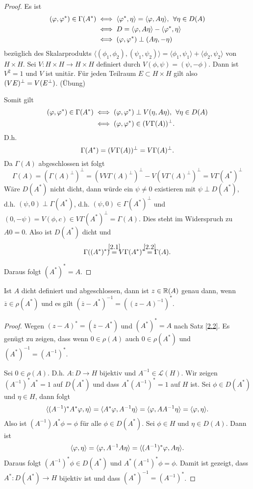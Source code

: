 \documentclass{mycourse}
\begin{document}
\begin{proof}
Es ist
\begin{align*}
(\phi, \phi^*)\in \Gamma(A^*) &\iff \langle \phi^*, \eta\rangle = \langle \phi, A\eta\rangle, \, \forall \eta\in D(A)\\ &\iff D=\langle \phi, A\eta\rangle - \langle \phi^*, \eta\rangle \\ &\iff (\phi, \phi^*) \orth (A\eta, - \eta)
\end{align*}
bezüglich des Skalarprodukts $\langle (\phi_1, \phi_2), (\psi_1, \psi_2)\rangle=\langle \phi_1, \psi_1\rangle + \langle \phi_2, \psi_2\rangle$ von $H\times H$. Sei $V:H\times H \to H \times H$ definiert durch $V(\phi, \psi)=(\psi, -\phi)$. Dann ist $V^2=1$ und $V$ ist unitär. Für jeden Teilraum $E\subset H\times H$ gilt also $(VE)^\perp = V(E^\perp)$. (Übung)

Somit gilt
\begin{align*}
(\phi, \phi^*) \in \Gamma(A^*) &\iff (\phi, \phi^*) \orth V(\eta, A\eta), \, \forall \eta\in D(A)\\
&\iff (\phi, \phi^*)\in (V\Gamma(A))^\orth.
\end{align*}
D.h. 
\begin{equation}\label{2.1}
\Gamma(A^*)=(V\Gamma(A))^\perp=V\Gamma(A)^\perp.
\end{equation}
Da $\Gamma(A)$ abgeschlossen ist folgt 
\begin{equation}\label{2.2}
\Gamma(A) = ( \Gamma(A)^\perp)^\perp = (VV \Gamma(A)^\perp)^\perp - V(V\Gamma(A)^\perp)^\perp = V \Gamma(A^*)^\perp
\end{equation}
Wäre $D(A^*)$ nicht dicht, dann würde ein $\psi \neq 0$ existieren mit $\psi \perp D(A^*)$, d.h. $(\psi,0) \perp \Gamma(A^*)$, d.h. $(\psi,0) \in \Gamma(A^*)^\perp$ und $(0,-\psi)=V(\phi, c) \in V \Gamma(A^*)^\perp= \Gamma(A)$. Dies steht im Widerspruch zu $A0=0$. Also ist $D(A^*)$ dicht und
\[
\Gamma((A^*)^*)\stack{\eqref{2.1}}= V \Gamma(A^*)^* \stack{\eqref{2.2}}= \Gamma(A).
\]
Daraus folgt $(A^*)^*=A$.
\end{proof}
\begin{st}\label{2.3}
Ist $A$ dicht definiert und abgeschlossen, dann ist $z\in \mathbb{R}(A)$ genau dann, wenn $\overline z \in \rho(A^*)$ und es gilt $(\overline z - A^*)^{-1} =((z-A)^{-1})^*$.
\end{st}
\begin{proof}
Wegen $(z-A)^* =(\overline z-A^*)$ und $(A^*)^*=A$ nach Satz \ref{2.2}. Es genügt zu zeigen, dass wenn $0 \in \rho(A)$ auch $0 \in \rho(A^*)$ und $(A^*)^{-1} = (A^{-1})^*$.

Sei $0 \in \rho(A)$. D.h. $A: D\to H$ bijektiv und $A^{-1} \in \mathcal L(H)$. Wir zeigen $(A^{-1})^* A^*=1$ auf $D(A^*)$ und dass $A^*(A^{-1})^*=1$ auf $H$ ist. Sei $\phi \in D(A^*)$ und $\eta \in H$, dann folgt
\[
\langle(A^{-1})^* A^* \varphi, \eta \rangle = \langle A^* \varphi, A^{-1} \eta \rangle = \langle \varphi, A A^{-1} \eta\rangle = \langle \varphi, \eta\rangle.
\]
Also ist $(A^{-1}) A^* \phi = \phi$ für alle $\phi \in D(A^*)$. Sei $\phi \in H$ und $\eta\in D(A)$. Dann ist
\[
\langle \varphi, \eta\rangle = \langle \varphi, A^{-1} A \eta\rangle = \langle (A^{-1})^* \varphi, A \eta\rangle.
\]
Daraus folgt $(A^{-1})^* \phi \in D(A^*)$ und $A^*(A^{-1})^* \phi = \phi$.  Damit ist gezeigt, dass $A^*: D(A^*) \to H$ bijektiv ist und dass $(A^*)^{-1} = (A^{-1})^*$.
\end{proof}
\end{document}
